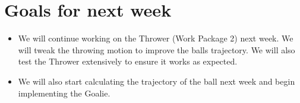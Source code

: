 \documentclass[12pt,pdftex,a4paper]{article}
\begin{document}
\section*{Goals for next week}
\begin{itemize}
\item
We will continue working on the Thrower (Work Package 2) next week.
We will tweak the throwing motion to improve the balls trajectory.
We will also test the Thrower extensively to ensure it works as expected.
\item
We will also start calculating the trajectory of the ball next week and begin implementing the Goalie.
\end{itemize}

\end{document}
